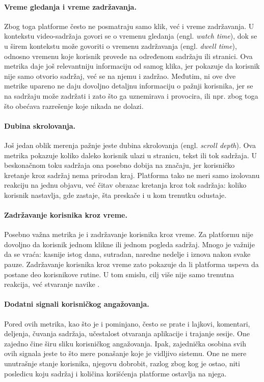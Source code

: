 \paragraph{Vreme gledanja i vreme zadržavanja.}
Zbog toga platforme često ne posmatraju samo klik, već i vreme zadržavanja. U kontekstu video-sadržaja govori se o vremenu gledanja (engl. \textit{watch time}), dok se u širem kontekstu može govoriti o vremenu zadržavanja (engl. \textit{dwell time}), odnosno vremenu koje korisnik provede na određenom sadržaju ili stranici. Ova metrika daje još relevantniju informaciju od samog klika, jer pokazuje da korisnik nije samo otvorio sadržaj, već se na njemu i zadržao. Međutim, ni ove dve metrike upareno ne daju dovoljno detaljnu informaciju o pažnji korisnika, jer se na sadržaju može zadržati i zato što ga uznemirava i provocira, ili npr. zbog toga što obećava razrešenje koje nikada ne dolazi.

\paragraph{Dubina skrolovanja.}
Još jedan oblik merenja pažnje jeste dubina skrolovanja (engl. \textit{scroll depth}). Ova metrika pokazuje koliko daleko korisnik ulazi u stranicu, tekst ili tok sadržaja. U beskonačnom toku sadržaja ona posebno dobija na značaju, jer korisničko kretanje kroz sadržaj nema prirodan kraj. Platforma tako ne meri samo izolovanu reakciju na jednu objavu, već čitav obrazac kretanja kroz tok sadržaja: koliko korisnik nastavlja, gde zastaje, šta preskače i u kom trenutku odustaje.

\paragraph{Zadržavanje korisnika kroz vreme.}
Posebno važna metrika je i zadržavanje korisnika kroz vreme. Za platformu nije dovoljno da korisnik jednom klikne ili jednom pogleda sadržaj. Mnogo je važnije da se vraća: kasnije istog dana, sutradan, naredne nedelje i iznova nakon svake pauze. Zadržavanje korisnika kroz vreme zato pokazuje da li platforma uspeva da postane deo korisnikove rutine. U tom smislu, cilj više nije samo trenutna reakcija, već stvaranje navike \cite{wu2017returning}.

\paragraph{Dodatni signali korisničkog angažovanja.}
Pored ovih metrika, kao što je i pominjano, često se prate i lajkovi, komentari, deljenja, čuvanja sadržaja, učestalost otvaranja aplikacije i trajanje sesije. One zajedno čine širu sliku korisničkog angažovanja. Ipak, zajednička osobina svih ovih signala jeste to što mere ponašanje koje je vidljivo sistemu. One ne mere unutrašnje stanje korisnika, njegovu dobrobit, razlog zbog kog je ostao, niti posledicu koju sadržaj i količina korišćenja platforme ostavlja na njega.

